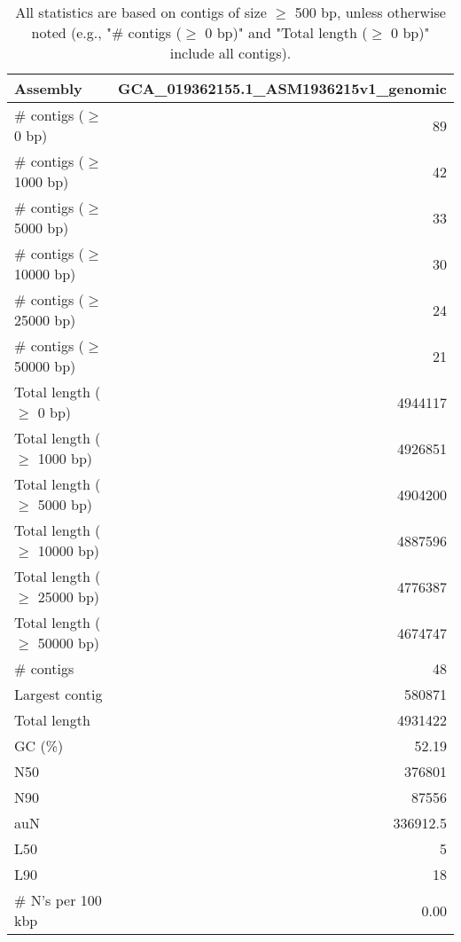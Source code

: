 \documentclass[12pt,a4paper]{article}
\begin{document}
\begin{table}[ht]
\begin{center}
\caption{All statistics are based on contigs of size $\geq$ 500 bp, unless otherwise noted (e.g., "\# contigs ($\geq$ 0 bp)" and "Total length ($\geq$ 0 bp)" include all contigs).}
\begin{tabular}{|l*{1}{|r}|}
\hline
Assembly & GCA\_019362155.1\_ASM1936215v1\_genomic \\ \hline
\# contigs ($\geq$ 0 bp) & 89 \\ \hline
\# contigs ($\geq$ 1000 bp) & 42 \\ \hline
\# contigs ($\geq$ 5000 bp) & 33 \\ \hline
\# contigs ($\geq$ 10000 bp) & 30 \\ \hline
\# contigs ($\geq$ 25000 bp) & 24 \\ \hline
\# contigs ($\geq$ 50000 bp) & 21 \\ \hline
Total length ($\geq$ 0 bp) & 4944117 \\ \hline
Total length ($\geq$ 1000 bp) & 4926851 \\ \hline
Total length ($\geq$ 5000 bp) & 4904200 \\ \hline
Total length ($\geq$ 10000 bp) & 4887596 \\ \hline
Total length ($\geq$ 25000 bp) & 4776387 \\ \hline
Total length ($\geq$ 50000 bp) & 4674747 \\ \hline
\# contigs & 48 \\ \hline
Largest contig & 580871 \\ \hline
Total length & 4931422 \\ \hline
GC (\%) & 52.19 \\ \hline
N50 & 376801 \\ \hline
N90 & 87556 \\ \hline
auN & 336912.5 \\ \hline
L50 & 5 \\ \hline
L90 & 18 \\ \hline
\# N's per 100 kbp & 0.00 \\ \hline
\end{tabular}
\end{center}
\end{table}
\end{document}
